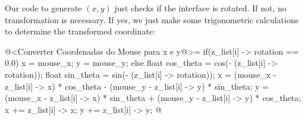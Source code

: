 Our code to generate $(x, y)$ just checks if the interface is
rotated. If not, no transformation is necessary. If yes, we just make
some trigonometric calculations to determine the transformed
coordinate:

\iniciocodigo
@<Converter Coordenadas do Mouse para x e y@>=
if(z_list[i] -> rotation == 0.0){
  x = mouse_x;
  y = mouse_y;
}
else{
 float cos_theta = cos(- (z_list[i] -> rotation));
 float sin_theta = sin(- (z_list[i] -> rotation));
 x = (mouse_x - z_list[i] -> x) * cos_theta -
       (mouse_y - z_list[i] -> y) * sin_theta;
 y = (mouse_x - z_list[i] -> x) * sin_theta +
       (mouse_y - z_list[i] -> y) * cos_theta;
 x +=  z_list[i] -> x;
 y +=  z_list[i] -> y;
}
@
\fimcodigo








\fim
